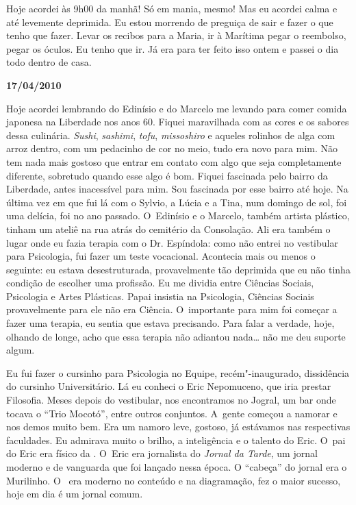 Hoje acordei às 9h00 da manhã! Só em mania, mesmo! Mas eu acordei
calma e até levemente deprimida. Eu estou morrendo de preguiça de sair e
fazer o que tenho que fazer. Levar os recibos para a Maria, ir à
Marítima pegar o reembolso, pegar os óculos. Eu tenho que ir. Já era
para ter feito isso ontem e passei o dia todo dentro de casa.

\begin{flushright}\textbf{17/04/2010}\end{flushright}


Hoje acordei lembrando do Edinísio e do Marcelo me levando para comer
comida japonesa na Liberdade nos anos 60. Fiquei maravilhada com as
cores e os sabores dessa culinária. \emph{Sushi}, \emph{sashimi},
\emph{tofu}, \emph{missoshiro} e aqueles rolinhos de alga com arroz
dentro, com um pedacinho de cor no meio, tudo era novo para mim. Não tem
nada mais gostoso que entrar em contato com algo que seja completamente
diferente, sobretudo quando esse algo é bom. Fiquei fascinada pelo
bairro da Liberdade, antes inacessível para mim. Sou fascinada por esse
bairro até hoje. Na última vez em que fui lá com o Sylvio, a Lúcia e a
Tina, num domingo de sol, foi uma delícia, foi no ano passado. O~Edinísio e o Marcelo, também artista plástico, tinham um ateliê na rua
atrás do cemitério da Consolação. Ali era também o lugar onde eu fazia
terapia com o Dr. Espíndola: como não entrei no vestibular para
Psicologia, fui fazer um teste vocacional. Acontecia mais ou menos o
seguinte: eu estava desestruturada, provavelmente tão deprimida que eu
não tinha condição de escolher uma profissão. Eu me dividia entre
Ciências Sociais, Psicologia e Artes Plásticas. Papai insistia na
Psicologia, Ciências Sociais provavelmente para ele não era Ciência. O~importante para mim foi começar a fazer uma terapia, eu sentia que
estava precisando. Para falar a verdade, hoje, olhando de longe, acho
que essa terapia não adiantou nada… não me deu suporte algum.

Eu fui fazer o cursinho para Psicologia no Equipe, recém"-inaugurado,
dissidência do cursinho Universitário. Lá eu conheci o Eric Nepomuceno,
que iria prestar Filosofia. Meses depois do vestibular, nos encontramos
no Jogral, um bar onde tocava o ``Trio Mocotó'', entre outros conjuntos.
A~gente começou a namorar e nos demos muito bem. Era um namoro leve,
gostoso, já estávamos nas respectivas faculdades. Eu admirava muito o
brilho, a inteligência e o talento do Eric. O~pai do Eric era físico da
. O~Eric era jornalista do \emph{Jornal da Tarde}, um jornal moderno
e de vanguarda que foi lançado nessa época. O ``cabeça'' do jornal era o
Murilinho. O~ era moderno no conteúdo e na diagramação, fez o maior
sucesso, hoje em dia é um jornal comum.

